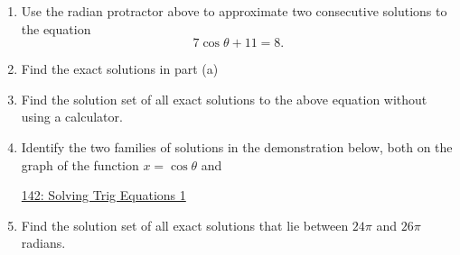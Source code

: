 \documentclass{ximera}
\begin{document}
\begin{question}  \label{Q:4dDFEFR33g3e}

 
\begin{onlineOnly}
    \begin{center}
\end{center}
\end{onlineOnly}

\begin{enumerate}
\item Use the radian protractor above to approximate two consecutive solutions to the equation
\[
   7 \cos\theta +11 =  8 .  
\]

\item Find the exact solutions in part (a)

\item Find the solution set of all exact solutions to the above equation without using a calculator.

\item Identify the two families of solutions in the demonstration below, both on the graph of the function $x=\cos\theta$ and 

\href{https://www.desmos.com/calculator/21454d4650}{142: Solving Trig Equations 1}
 
\begin{onlineOnly}
    \begin{center}
\end{center}
\end{onlineOnly}


\item Find the solution set of all exact solutions that lie between $24\pi$ and $26\pi$ radians.

\end{enumerate}
\end{question}
\end{document}
